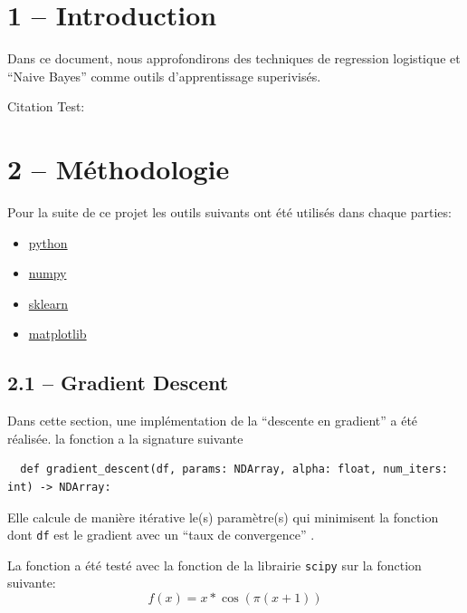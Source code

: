 \documentclass[
]{article}
\author{}
\date{}
\providecommand{\tightlist}{%
  \setlength{\itemsep}{0pt}\setlength{\parskip}{0pt}}
\begin{document}
\intro{}

\hypertarget{introduction}{%
\section{1 -- Introduction}\label{introduction}}

Dans ce document, nous approfondirons des techniques de regression
logistique et ``Naive Bayes'' comme outils d'apprentissage superivisés.

Citation Test: \cite{LinearModels}

\hypertarget{muxe9thodologie}{%
\section{2 -- Méthodologie}\label{muxe9thodologie}}

Pour la suite de ce projet les outils suivants ont été utilisés dans
chaque parties:

\begin{itemize}
\tightlist
\item
  \href{https://www.python.org/}{python}
\item
  \href{https://numpy.org/}{numpy}
\item
  \href{https://scikit-learn.org/stable/}{sklearn}
\item
  \href{https://matplotlib.org/}{matplotlib}
\end{itemize}

\hypertarget{gradient-descent}{%
\subsection{2.1 -- Gradient Descent}\label{gradient-descent}}

Dans cette section, une implémentation de la ``descente en gradient'' a
été réalisée. la fonction a la signature suivante

\begin{lstlisting}
  def gradient_descent(df, params: NDArray, alpha: float, num_iters: int) -> NDArray:  
\end{lstlisting}

Elle calcule de manière itérative le(s) paramètre(s)  qui
minimisent la fonction dont \texttt{df} est le gradient avec un ``taux
de convergence'' .

La fonction a été testé avec la fonction 
\cite{ScipyOptimizeFmin} de la librairie \texttt{scipy} sur la fonction
suivante: \[
f(x) = x * \cos(\pi  (x + 1))
\]
\end{document}
